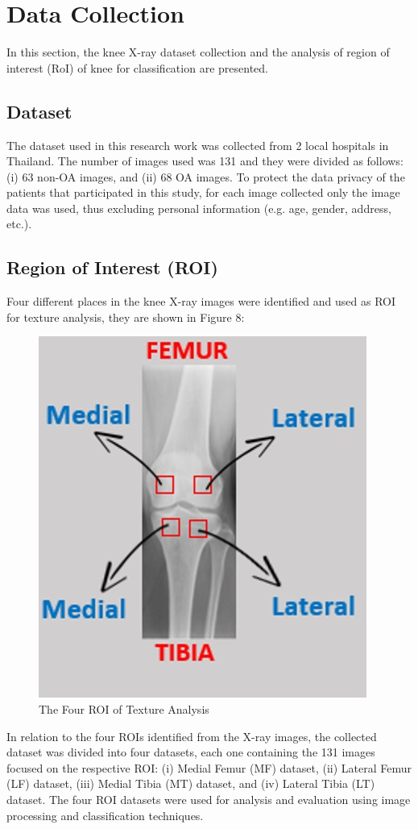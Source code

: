\documentclass[review]{elsarticle}
\begin{document}
\section{Data Collection}

In this section, the knee X-ray dataset collection and the analysis of region of interest (RoI) of knee for classification are presented.

\subsection{Dataset}

The dataset used in this research work was collected from 2 local hospitals in Thailand. The number of images used was 131 and they were divided as follows: (i) 63 non-OA images, and (ii) 68 OA images. To protect the data privacy of the patients that participated in this study, for each image collected only the image data was used, thus excluding personal information (e.g. age, gender, address, etc.).

\subsection{Region of Interest (ROI)}

Four different places in the knee X-ray images were identified and used as ROI for texture analysis, they are shown in Figure 8: \\

\begin{figure}[h]
	\centering
	\includegraphics[width=0.5\linewidth]{pic/fig9}
	\caption{The Four ROI of Texture Analysis}
	\label{fig:fig9}
\end{figure}

In relation to the four ROIs identified from the X-ray images, the collected dataset was divided into four datasets, each one containing the 131 images focused on the respective ROI: (i) Medial Femur (MF) dataset, (ii) Lateral Femur (LF) dataset, (iii) Medial Tibia (MT) dataset, and (iv) Lateral Tibia (LT) dataset. The four ROI datasets were used for analysis and evaluation using image processing and classification techniques.
\end{document}
